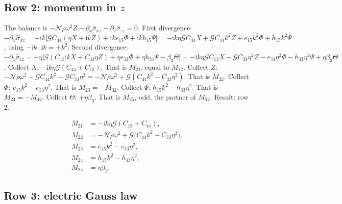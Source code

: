 \documentclass[11pt]{article}
\makeatletter
\newif\ifshowworked
\newenvironment{worked}{%
  \ifshowworked\par\smallskip\noindent\textit{Working.}\par\smallskip\else
  \setbox\z@\vbox\bgroup\fi}{\ifshowworked\par\smallskip\else\egroup\fi}
\newcommand{\ii}{\mathrm{i}}
\newcommand{\Ncal}{\mathcal{N}}
\newcommand{\Gcal}{\mathcal{G}}
\makeatother
\begin{document}
\subsection*{Row 2: momentum in $z$}

\begin{worked}
The balance is $-\Ncal\rho\omega^2Z-\partial_x\hat\sigma_{xz}-\partial_z\hat\sigma_{zz}=0$.
First divergence: $-\partial_x\hat\sigma_{xz}
=-\ii k\bigl[\Gcal C_{44}(\eta X+\ii kZ)+\ii ke_{15}\Phi+\ii kh_{15}\Psi\bigr]
=-\ii k\eta\Gcal C_{44}X+\Gcal C_{44}k^2Z+e_{15}k^2\Phi+h_{15}k^2\Psi$,
using $-\ii k\cdot\ii k=+k^2$.
Second divergence: $-\partial_z\hat\sigma_{zz}
=-\eta\bigl[\Gcal(C_{13}\ii kX+C_{33}\eta Z)+\eta e_{33}\Phi+\eta h_{33}\Psi-\beta_3\Theta\bigr]
=-\ii k\eta\Gcal C_{13}X-\Gcal C_{33}\eta^2Z-e_{33}\eta^2\Phi-h_{33}\eta^2\Psi+\eta\beta_3\Theta$.
Collect $X$: $-\ii k\eta\Gcal(C_{44}+C_{13})$. That is $M_{21}$, equal to $M_{12}$.
Collect $Z$: $-\Ncal\rho\omega^2+\Gcal C_{44}k^2-\Gcal C_{33}\eta^2
=-\Ncal\rho\omega^2+\Gcal(C_{44}k^2-C_{33}\eta^2)$. That is $M_{22}$.
Collect $\Phi$: $e_{15}k^2-e_{33}\eta^2$. That is $M_{23}=-M_{32}$.
Collect $\Psi$: $h_{15}k^2-h_{33}\eta^2$. That is $M_{24}=-M_{42}$.
Collect $\Theta$: $+\eta\beta_3$. That is $M_{25}$, odd, the partner of $M_{52}$.
Result: row 2.
\end{worked}

\begin{align}
M_{21}&=-\ii k\eta\Gcal(C_{13}+C_{44}), \\
M_{22}&=-\Ncal\rho\omega^2+\Gcal\bigl(C_{44}k^2-C_{33}\eta^2\bigr), \\
M_{23}&=e_{15}k^2-e_{33}\eta^2, \\
M_{24}&=h_{15}k^2-h_{33}\eta^2, \\
M_{25}&=\eta\beta_3 .
\end{align}

\subsection*{Row 3: electric Gauss law}
\end{document}

